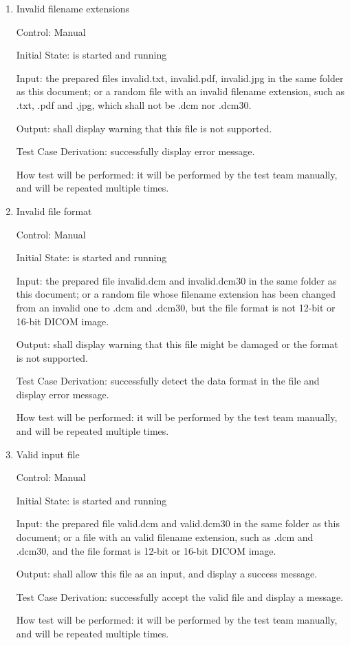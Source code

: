 \documentclass[12pt, titlepage]{article}
\begin{document}
\begin{enumerate}

\item{Invalid filename extensions}

Control: Manual
					
Initial State: \progname{} is started and running
					
Input: the prepared files invalid.txt, invalid.pdf, invalid.jpg in the same folder as this document; or a random file with an invalid filename extension, such as .txt, .pdf and .jpg, which shall not be .dcm nor .dcm30.
					
Output: \progname{} shall display warning that this file is not supported.

Test Case Derivation: successfully display error message.
					
How test will be performed: it will be performed by the test team manually, and will be repeated multiple times.
					
\item{Invalid file format}

Control: Manual
					
Initial State: \progname{} is started and running
					
Input: the prepared file invalid.dcm and invalid.dcm30 in the same folder as this document; or a random file whose filename extension has been changed from an invalid one to .dcm and .dcm30, but the file format is not 12-bit or 16-bit DICOM image.
					
Output: \progname{} shall display warning that this file might be damaged or the format is not supported.

Test Case Derivation: successfully detect the data format in the file and display error message.

How test will be performed: it will be performed by the test team manually, and will be repeated multiple times.

\item{Valid input file}

Control: Manual
					
Initial State: \progname{} is started and running
					
Input: the prepared file valid.dcm and valid.dcm30 in the same folder as this document; or a file with an valid filename extension, such as .dcm and .dcm30, and the file format is 12-bit or 16-bit DICOM image.
					
Output: \progname{} shall allow this file as an input, and display a success message.

Test Case Derivation: successfully accept the valid file and display a message.

How test will be performed: it will be performed by the test team manually, and will be repeated multiple times.
\end{enumerate}
\end{document}
